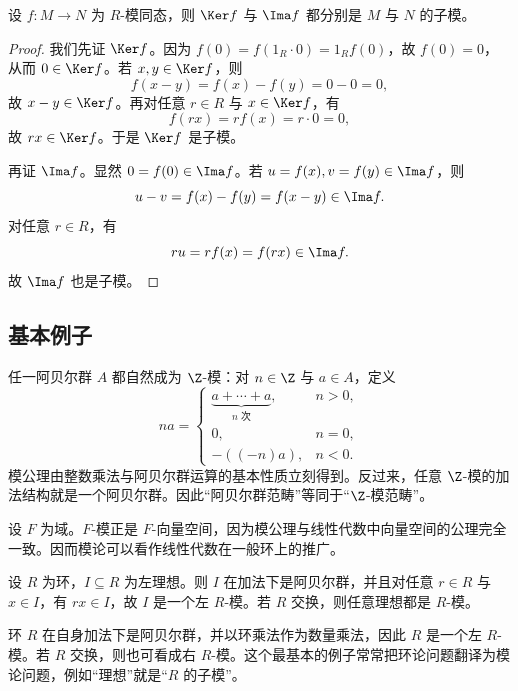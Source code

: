 \begin{proposition}
设 $f\colon M\to N$ 为 $R$-模同态，则 $\Ker f$ 与 $\Ima f$ 都分别是 $M$ 与 $N$ 的子模。
\end{proposition}

\begin{proof}
我们先证 $\Ker f$。因为 $f(0)=f(1_R\cdot 0)=1_Rf(0)$，故 $f(0)=0$，从而 $0\in \Ker f$。若 $x,y\in \Ker f$，则
\[
f(x-y)=f(x)-f(y)=0-0=0,
\]
故 $x-y\in \Ker f$。再对任意 $r\in R$ 与 $x\in \Ker f$，有
\[
f(rx)=rf(x)=r\cdot 0=0,
\]
故 $rx\in \Ker f$。于是 $\Ker f$ 是子模。

再证 $\Ima f$。显然 $0=f(0)\in \Ima f$。若 $u=f(x),v=f(y)\in \Ima f$，则
\[
u-v=f(x)-f(y)=f(x-y)\in \Ima f.
\]
对任意 $r\in R$，有
\[
ru=rf(x)=f(rx)\in \Ima f.
\]
故 $\Ima f$ 也是子模。
\end{proof}

\subsection{基本例子}

\begin{example}[阿贝尔群就是 $\Z$-模]
任一阿贝尔群 $A$ 都自然成为 $\Z$-模：对 $n\in \Z$ 与 $a\in A$，定义
\[
na=\begin{cases}
\underbrace{a+\cdots+a}_{n\text{ 次}},&n>0,\\
0,&n=0,\\
-( (-n)a),&n<0.
\end{cases}
\]
模公理由整数乘法与阿贝尔群运算的基本性质立刻得到。反过来，任意 $\Z$-模的加法结构就是一个阿贝尔群。因此“阿贝尔群范畴”等同于“$\Z$-模范畴”。
\end{example}

\begin{example}[向量空间就是域上的模]
设 $F$ 为域。$F$-模正是 $F$-向量空间，因为模公理与线性代数中向量空间的公理完全一致。因而模论可以看作线性代数在一般环上的推广。
\end{example}

\begin{example}[理想是自然的模]
设 $R$ 为环，$I\subseteq R$ 为左理想。则 $I$ 在加法下是阿贝尔群，并且对任意 $r\in R$ 与 $x\in I$，有 $rx\in I$，故 $I$ 是一个左 $R$-模。若 $R$ 交换，则任意理想都是 $R$-模。
\end{example}

\begin{example}[环自身作为模]
环 $R$ 在自身加法下是阿贝尔群，并以环乘法作为数量乘法，因此 $R$ 是一个左 $R$-模。若 $R$ 交换，则也可看成右 $R$-模。这个最基本的例子常常把环论问题翻译为模论问题，例如“理想”就是“$R$ 的子模”。
\end{example}

